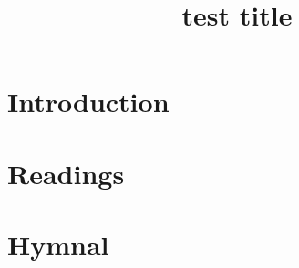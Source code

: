 \documentclass{book}
\title{test title}
\author{}
\date{}
\begin{document}
\frontmatter
\cleardoublepage
\maketitle
\tableofcontents

\mainmatter
\part{Introduction}


\part{Readings}


\part{Hymnal}


\cleardoublepage
{}
\printindex
\end{document}

